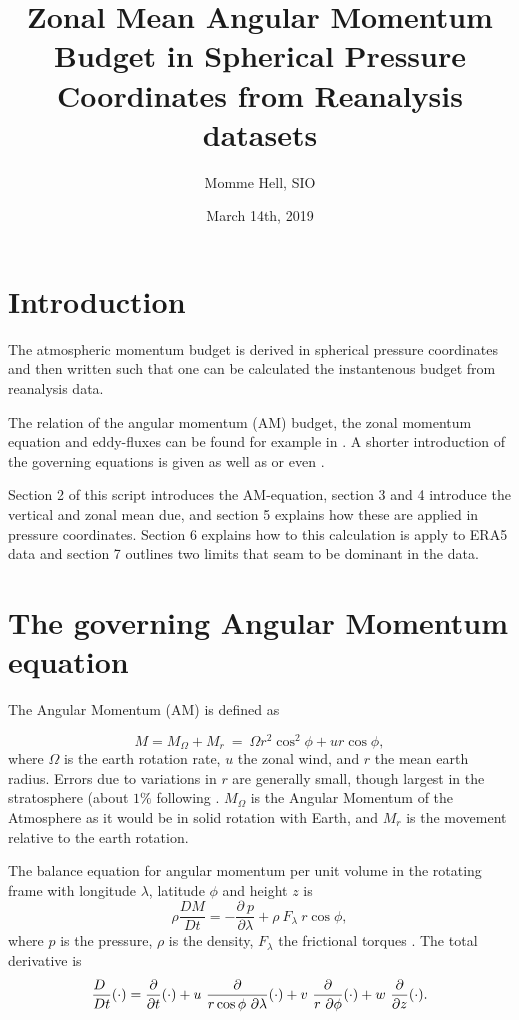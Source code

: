 \documentclass[11pt]{article}
\title{Zonal Mean Angular Momentum Budget in Spherical Pressure Coordinates from Reanalysis datasets}
\author{Momme Hell, SIO}
\date{March 14th, 2019}      %
\numberwithin{equation}{section}
\newcommand{\beq}{\begin{equation}}
\newcommand{\eeq}{\end{equation}}
\newcommand{\Dt}[1]{\frac{D#1}{D t}}
\newcommand{\cphi}{\cos \phi}
\begin{document}
\maketitle

\section{Introduction}
The atmospheric momentum budget is derived in spherical pressure coordinates and then written such that one can be calculated the instantenous budget from reanalysis data.\par

The relation of the angular momentum (AM) budget, the zonal momentum equation and eddy-fluxes can be found for example in \citet[chapter 11,][]{Peixoto2008}. A shorter introduction of the governing equations is given \citet[chapter 4.12, and 13.10,][]{Gill1982} as well as \citet{Andrews1987} or even \citet{Holton1975}.\par

Section 2 of this script introduces the AM-equation, section 3 and 4 introduce the vertical and zonal mean due, and section 5 explains how these are applied in pressure coordinates. Section 6 explains how to this calculation is apply to ERA5 data and section 7 outlines two limits that seam to be dominant in the data. 

\section{The governing Angular Momentum equation}
The Angular Momentum (AM) is defined as 

\beq
M = M_\Omega + M_r ~=~ \Omega r^2 \cos^2 \phi + u r\cos \phi, 
\eeq
%
where $\Omega$ is the earth rotation rate, $u$ the zonal wind, and $r$ the mean earth radius. Errors due to variations in $r$ are generally small, though largest in the stratosphere (about $1\%$ following \citet[][chapter 4.12, p.93]{Gill1982}. $M_\Omega$ is the Angular Momentum of the Atmosphere as it would be in solid rotation with Earth, and $M_r$ is the movement relative to the earth rotation.\par

The balance equation for angular momentum per unit volume in the rotating frame with longitude $\lambda$, latitude $\phi$ and height $z$ is  
\beq
\rho \Dt M = - \frac{\partial~p}{\partial \lambda} + \rho~F_\lambda~ r \cphi, 
\eeq
where $p$ is the pressure, $\rho$ is the density, $F_\lambda$ the frictional torques \citep[eq. 11.4,][]{Peixoto2008}. The total derivative is 
\beq
\Dt~(\cdot) = \frac{\partial}{\partial t} (\cdot) + u~ \frac{\partial}{r \cphi ~\partial \lambda}  (\cdot) + v~ \frac{\partial}{r~ \partial \phi} (\cdot) + w ~ \frac{\partial}{\partial z}  (\cdot).
\eeq
\end{document}

